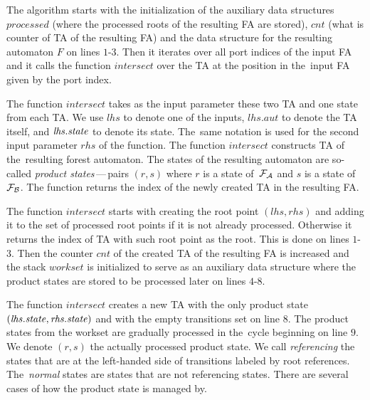 The algorithm starts with the initialization of the auxiliary
data structures $\mathit{processed}$ (where the processed roots of the resulting FA are stored),
$\mathit{cnt}$ (what is counter of TA of the resulting FA)
and the data structure for the resulting automaton $F$ on lines $1$-$3$.
Then it iterates over all port indices of the input FA
and it calls the function $\mathit{intersect}$ over the TA at the position in
the~input FA given by the port index.

The function $\mathit{intersect}$ takes as the input parameter these two TA
and one state from each TA.
We use $\mathit{lhs}$ to denote one of the inputs,
$\mathit{lhs.aut}$ to denote the TA itself, and $\mathit{lhs.state}$ to denote its state.
The~same notation is used for the second input parameter $\mathit{rhs}$ of the function.
The function $\mathit{intersect}$ constructs TA of the~resulting forest automaton.
The states of the resulting automaton are so-called \emph{product states}\,---\,pairs $(r,s)$ where $r$ is a state of~$\mathcal{F}_{\mathcal{A}}$
and $s$ is a state of~$\mathcal{F}_{\mathcal{B}}$.
The function returns the index of the newly created TA in the resulting FA.

The function $\mathit{intersect}$ starts with creating the root point $(lhs,rhs)$ and
adding it to the set of processed root points if it is not already processed.
Otherwise it returns the index of TA with such root point as the root.
This is done on lines $1$-$3$.
Then the counter $\mathit{cnt}$ of the created TA of the resulting FA is increased and
the stack $\mathit{workset}$ is initialized to serve as an auxiliary data
structure where the product states are stored to be processed later on lines $4$-$8$.

The function $\mathit{intersect}$ creates a new TA with the only product state $(\mathit{lhs.state}, \mathit{rhs.state})$
and with the empty transitions set on line $8$.
The product states from the workset are gradually processed in the~cycle beginning
on line $9$.
We denote $(r,s)$ the actually processed product state.
We call \emph{referencing} the states that are at the left-handed side
of transitions labeled by root references.
The~\emph{normal} states are states that are not referencing states.
There are several cases of how the product state is managed by.



